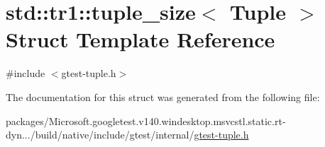 \hypertarget{structstd_1_1tr1_1_1tuple__size}{}\section{std\+::tr1\+::tuple\+\_\+size$<$ Tuple $>$ Struct Template Reference}
\label{structstd_1_1tr1_1_1tuple__size}


{\ttfamily \#include $<$gtest-\/tuple.\+h$>$}



The documentation for this struct was generated from the following file\+:\begin{DoxyCompactItemize}
\item 
packages/\+Microsoft.\+googletest.\+v140.\+windesktop.\+msvcstl.\+static.\+rt-\/dyn.../build/native/include/gtest/internal/\mbox{\hyperlink{gtest-tuple_8h}{gtest-\/tuple.\+h}}\end{DoxyCompactItemize}
